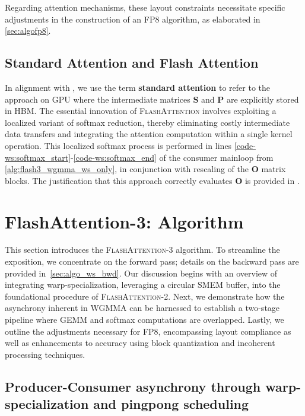 Regarding attention mechanisms, these layout constraints necessitate specific adjustments in the construction of an FP8 algorithm, as elaborated in \cref{sec:algofp8}.

\subsection{Standard Attention and Flash Attention} In alignment with \citet{dao2022flashattention}, we use the term \textbf{standard attention} to refer to the approach on GPU where the intermediate matrices $\mathbf{S}$ and $\mathbf{P}$ are explicitly stored in HBM. The essential innovation of \textsc{FlashAttention} involves exploiting a localized variant of softmax reduction, thereby eliminating costly intermediate data transfers and integrating the attention computation within a single kernel operation. This localized softmax process is performed in lines \ref{code-ws:softmax_start}-\ref{code-ws:softmax_end} of the consumer mainloop from \cref{alg:flash3_wgmma_ws_only}, in conjunction with rescaling of the $\mathbf{O}$ matrix blocks. The justification that this approach correctly evaluates $\mathbf{O}$ is provided in \cite[\S 2.3.1]{dao2023flashattention2}.

\section{FlashAttention-3: Algorithm}
\label{sec:algo}

This section introduces the \textsc{FlashAttention-3} algorithm. To streamline the exposition, we concentrate on the forward pass; details on the backward pass are provided in~\cref{sec:algo_ws_bwd}. Our discussion begins with an overview of integrating warp-specialization, leveraging a circular SMEM buffer, into the foundational procedure of \textsc{FlashAttention-2}. Next, we demonstrate how the asynchrony inherent in WGMMA can be harnessed to establish a two-stage pipeline where GEMM and softmax computations are overlapped. Lastly, we outline the adjustments necessary for FP8, encompassing layout compliance as well as enhancements to accuracy using block quantization and incoherent processing techniques.

\subsection{Producer-Consumer asynchrony through warp-specialization and pingpong scheduling}
\label{sec:algo_ws}

